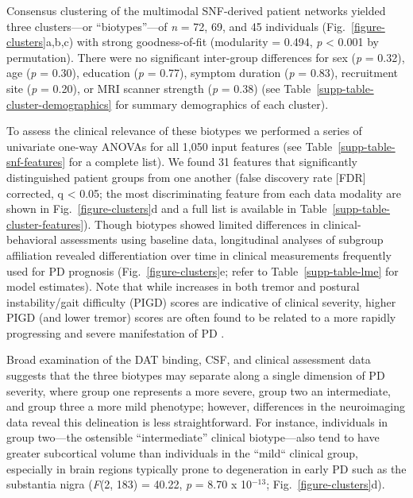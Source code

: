 \documentclass[12pt,aps,pra,reprint,showkeys]{revtex4-1}
\begin{document}
Consensus clustering of the multimodal SNF-derived patient networks yielded three clusters---or ``biotypes''---of \emph{n} = 72, 69, and 45 individuals (Fig.~\ref{figure-clusters}a,b,c) with strong goodness-of-fit (modularity = 0.494, \emph{p} < 0.001 by permutation).
There were no significant inter-group differences for sex (\emph{p} = 0.32), age (\emph{p} = 0.30), education (\emph{p} = 0.77), symptom duration (\emph{p} = 0.83), recruitment site (\emph{p} = 0.20), or MRI scanner strength (\emph{p} = 0.38) (see Table~\ref{supp-table-cluster-demographics} for summary demographics of each cluster).

To assess the clinical relevance of these biotypes we performed a series of univariate one-way ANOVAs for all 1,050 input features (see Table~\ref{supp-table-snf-features} for a complete list).
We found 31 features that significantly distinguished patient groups from one another (false discovery rate [FDR] corrected, q < 0.05; the most discriminating feature from each data modality are shown in Fig.~\ref{figure-clusters}d and a full list is available in Table~\ref{supp-table-cluster-features}).
Though biotypes showed limited differences in clinical-behavioral assessments using baseline data, longitudinal analyses of subgroup affiliation revealed differentiation over time in clinical measurements frequently used for PD prognosis (Fig.~\ref{figure-clusters}e; refer to Table~\ref{supp-table-lme} for model estimates).
Note that while increases in both tremor and postural instability/gait difficulty (PIGD) scores are indicative of clinical severity, higher PIGD (and lower tremor) scores are often found to be related to a more rapidly progressing and severe manifestation of PD \citep{jankovic2001functional}.

Broad examination of the DAT binding, CSF, and clinical assessment data suggests that the three biotypes may separate along a single dimension of PD severity, where group one represents a more severe, group two an intermediate, and group three a more mild phenotype; however, differences in the neuroimaging data reveal this delineation is less straightforward.
For instance, individuals in group two---the ostensible ``intermediate'' clinical biotype---also tend to have greater subcortical volume than individuals in the ``mild`` clinical group, especially in brain regions typically prone to degeneration in early PD such as the substantia nigra (\emph{F}(2, 183) = 40.22, \emph{p} = 8.70 x 10$^{-13}$; Fig.~\ref{figure-clusters}d).
\end{document}
